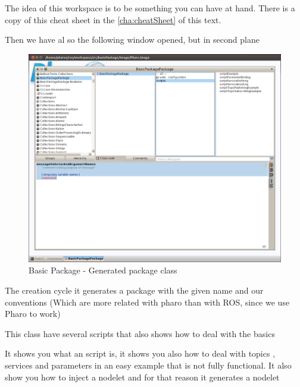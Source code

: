 \documentclass[a4paper,10pt,twoside]{book}
\begin{document}
				The idea of this workspace is to be something you can have at hand. There is a copy of this cheat sheet in the \autoref{cha:cheatSheet} of this text.
				
				
				Then we have al so the following window opened, but in second plane
				
				\begin{figure}[!htbp]
			  		\centering
				    		\includegraphics[width=1\textwidth]{BasicPackage2.png}
						
						\caption{Basic Package - Generated package class}
					\centering
				\end{figure}
				
				
				The creation cycle it generates a package with the given name and our \fwkName{} conventions (Which are more related with pharo than with ROS, since we use Pharo to work)
				
				
				This class have several scripts that also shows how to deal with the basics 
				
				It shows you what an script is, it shows you also how to deal with topics , services and parameters in an easy example that is not fully functional.
				It also show you how to inject a nodelet and for that reason it generates a nodelet
				
\end{document}
